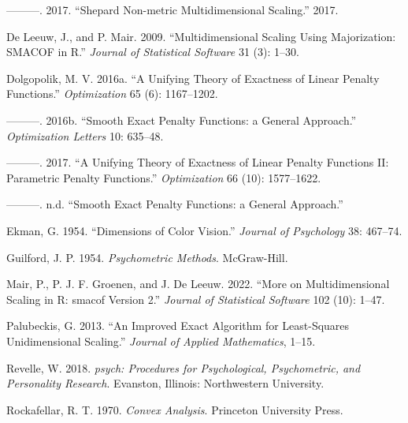 \documentclass[
  12pt,
]{article}
\newlength{\cslhangindent}
\newlength{\cslentryspacingunit} %
\newenvironment{CSLReferences}[2] %
 {%
  \setlength{\parindent}{0pt}
  \ifodd #1
  \let\oldpar\par
  \def\par{\hangindent=\cslhangindent\oldpar}
  \fi
  \setlength{\parskip}{#2\cslentryspacingunit}
 }%
 {}
\begin{document}
\begin{CSLReferences}{1}{0}
\leavevmode{}%
---------. 2017. {``{Shepard Non-metric Multidimensional Scaling}.''}
2017.

\leavevmode{}%
De Leeuw, J., and P. Mair. 2009. {``{Multidimensional Scaling Using
Majorization: SMACOF in R}.''} \emph{Journal of Statistical Software} 31
(3): 1--30.

\leavevmode{}%
Dolgopolik, M. V. 2016a. {``{A Unifying Theory of Exactness of Linear
Penalty Functions}.''} \emph{Optimization} 65 (6): 1167--1202.

\leavevmode{}%
---------. 2016b. {``{Smooth Exact Penalty Functions: a General
Approach}.''} \emph{Optimization Letters} 10: 635--48.

\leavevmode{}%
---------. 2017. {``{A Unifying Theory of Exactness of Linear Penalty
Functions II: Parametric Penalty Functions}.''} \emph{Optimization} 66
(10): 1577--1622.

\leavevmode{}%
---------. n.d. {``{Smooth Exact Penalty Functions: a General
Approach}.''}

\leavevmode{}%
Ekman, G. 1954. {``{Dimensions of Color Vision}.''} \emph{Journal of
Psychology} 38: 467--74.

\leavevmode{}%
Guilford, J. P. 1954. \emph{Psychometric Methods}. McGraw-Hill.

\leavevmode{}%
Mair, P., P. J. F. Groenen, and J. De Leeuw. 2022. {``{More on
Multidimensional Scaling in R: smacof Version 2}.''} \emph{Journal of
Statistical Software} 102 (10): 1--47.

\leavevmode{}%
Palubeckis, G. 2013. {``{An Improved Exact Algorithm for Least-Squares
Unidimensional Scaling}.''} \emph{Journal of Applied Mathematics},
1--15.

\leavevmode{}%
Revelle, W. 2018. \emph{{psych: Procedures for Psychological,
Psychometric, and Personality Research}}.{ Evanston, Illinois}:{
Northwestern University}.

\leavevmode{}%
Rockafellar, R. T. 1970. \emph{Convex Analysis}. Princeton University
Press.


\end{CSLReferences}
\end{document}
